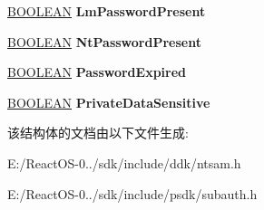 \begin{DoxyCompactItemize}
\item 
\mbox{\label{struct___u_s_e_r___a_l_l___i_n_f_o_r_m_a_t_i_o_n_a6e4247ed3d038803221988b712a73f0c}} 
\hyperlink{_processor_bind_8h_a112e3146cb38b6ee95e64d85842e380a}{B\+O\+O\+L\+E\+AN} {\bfseries Lm\+Password\+Present}
\item 
\mbox{\label{struct___u_s_e_r___a_l_l___i_n_f_o_r_m_a_t_i_o_n_ae0027ddfe8dd26f3e45d2a8a67acf777}} 
\hyperlink{_processor_bind_8h_a112e3146cb38b6ee95e64d85842e380a}{B\+O\+O\+L\+E\+AN} {\bfseries Nt\+Password\+Present}
\item 
\mbox{\label{struct___u_s_e_r___a_l_l___i_n_f_o_r_m_a_t_i_o_n_ac51a8b48c57b196ab6071ea764a1821d}} 
\hyperlink{_processor_bind_8h_a112e3146cb38b6ee95e64d85842e380a}{B\+O\+O\+L\+E\+AN} {\bfseries Password\+Expired}
\item 
\mbox{\label{struct___u_s_e_r___a_l_l___i_n_f_o_r_m_a_t_i_o_n_a1323f594488e58cfc46fefde535d1664}} 
\hyperlink{_processor_bind_8h_a112e3146cb38b6ee95e64d85842e380a}{B\+O\+O\+L\+E\+AN} {\bfseries Private\+Data\+Sensitive}
\end{DoxyCompactItemize}


该结构体的文档由以下文件生成\+:\begin{DoxyCompactItemize}
\item 
E\+:/\+React\+O\+S-\/0../sdk/include/ddk/ntsam.\+h\item 
E\+:/\+React\+O\+S-\/0../sdk/include/psdk/subauth.\+h\end{DoxyCompactItemize}
